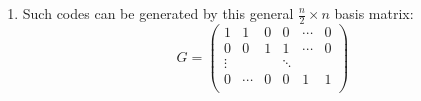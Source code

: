 \documentclass[a4paper,9pt]{extarticle}
\begin{document}
\begin{enumerate}
\begin{enumerate}
    \end{enumerate}
  \item Such codes can be generated by this general $\frac{n}{2}\times n$ basis matrix:
    \[ 
      G=
      \begin{pmatrix}
        1 & 1 & 0 & 0 & \cdots & 0 \\
        0 & 0 & 1 & 1 & \cdots & 0 \\
        \vdots &   &   & \ddots \\
        0 & \cdots & 0 & 0 & 1 & 1 \\
      \end{pmatrix}
    \]
\end{enumerate}
\end{document}
